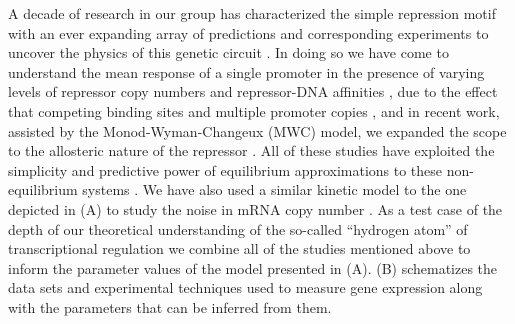 A decade of research in our group has characterized the simple repression motif
with an ever expanding array of predictions and corresponding experiments to
uncover the physics of this genetic circuit . In doing so
we have come to understand the mean response of a single promoter in the
presence of varying levels of repressor copy numbers and repressor-DNA
affinities \cite{Garcia2011c}, due to the effect that competing binding sites
and multiple promoter copies \cite{Brewster2014}, and in recent work, assisted
by the Monod-Wyman-Changeux (MWC) model, we expanded the scope to the allosteric
nature of the repressor \cite{Razo-Mejia2018}. All of these studies have
exploited the simplicity and predictive power of equilibrium approximations to
these non-equilibrium systems \cite{Buchler2003}. We have also used a similar
kinetic model to the one depicted in (A) to study the
noise in mRNA copy number \cite{Jones2014a}. As a test case of the depth of our
theoretical understanding of the so-called ``hydrogen atom'' of transcriptional
regulation we combine all of the studies mentioned above to inform the parameter
values of the model presented in (A).
(B) schematizes the data sets and experimental
techniques used to measure gene expression along with the parameters that can be
inferred from them.


